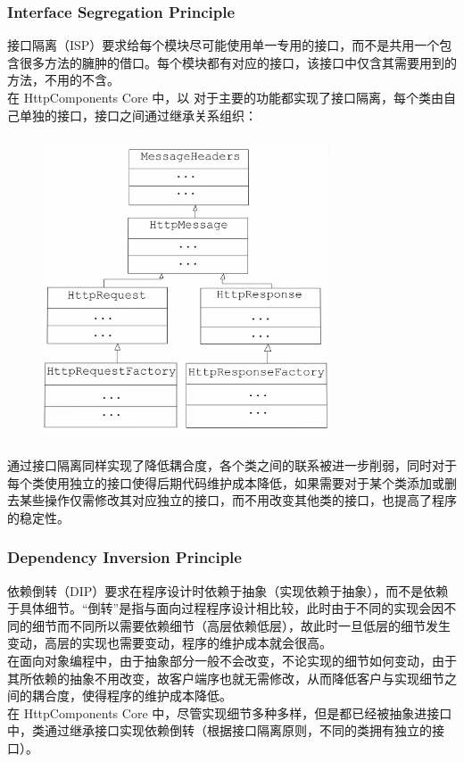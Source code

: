 \documentclass{article}
\begin{document}
	\subsubsection{Interface Segregation Principle}
	\begin{CJK}{UTF8}{gbsn}
		\indent \indent 接口隔离（ISP）要求给每个模块尽可能使用单一专用的接口，而不是共用一个包含很多方法的臃肿的借口。每个模块都有对应的接口，该接口中仅含其需要用到的方法，不用的不含。\\
		\indent 在 HttpComponents Core 中，以 对于主要的功能都实现了接口隔离，每个类由自己单独的接口，接口之间通过继承关系组织：
	\end{CJK}{}
	\begin{figure}[H]
		\centering
		\includegraphics[height = 9cm, width = 8.5cm]{pics/36_Interfaces.jpg}	
	\end{figure}
	\begin{CJK}{UTF8}{gbsn}
		\indent \indent 通过接口隔离同样实现了降低耦合度，各个类之间的联系被进一步削弱，同时对于每个类使用独立的接口使得后期代码维护成本降低，如果需要对于某个类添加或删去某些操作仅需修改其对应独立的接口，而不用改变其他类的接口，也提高了程序的稳定性。
	\end{CJK}{}

	\subsubsection{Dependency Inversion Principle}
	\begin{CJK}{UTF8}{gbsn}
		\indent \indent 依赖倒转（DIP）要求在程序设计时依赖于抽象（实现依赖于抽象），而不是依赖于具体细节。“倒转”是指与面向过程程序设计相比较，此时由于不同的实现会因不同的细节而不同所以需要依赖细节（高层依赖低层），故此时一旦低层的细节发生变动，高层的实现也需要变动，程序的维护成本就会很高。\\
		\indent 在面向对象编程中，由于抽象部分一般不会改变，不论实现的细节如何变动，由于其所依赖的抽象不用改变，故客户端序也就无需修改，从而降低客户与实现细节之间的耦合度，使得程序的维护成本降低。\\
		\indent 在 HttpComponents Core 中，尽管实现细节多种多样，但是都已经被抽象进接口中，类通过继承接口实现依赖倒转（根据接口隔离原则，不同的类拥有独立的接口）。
	\end{CJK}{}
\end{document}

